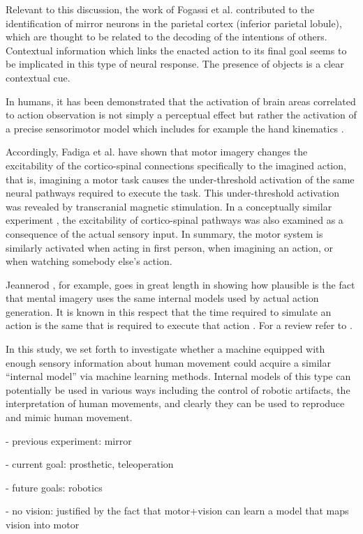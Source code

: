 Relevant to this discussion, the work of Fogassi et al. \cite{fogassi-05} contributed to the 
identification of mirror neurons in the parietal cortex (inferior parietal lobule), which are 
thought to be related to the decoding of the intentions of others. Contextual information 
which links the enacted action to its final goal seems to be implicated in this type of neural 
response. The presence of objects is a clear contextual cue.

In humans, it has been demonstrated that the activation of brain areas correlated to 
action observation is not simply a perceptual effect but rather the activation of
a precise sensorimotor model which includes for example the hand kinematics \cite{pozzo-06}.
 
Accordingly, Fadiga et al. \cite{fadiga-99,vargas-04} have shown that motor imagery changes
the excitability of the cortico-spinal connections specifically to the imagined action, that is, 
imagining a motor task causes the under-threshold activation of the same neural pathways 
required to execute the task. This under-threshold activation was revealed 
by transcranial magnetic stimulation. In a conceptually similar experiment 
\cite{fadiga-05}, the excitability of cortico-spinal pathways was also examined as a consequence 
of the actual sensory input. In summary, the motor system is similarly activated 
when acting in first person, when imagining an action, or when watching somebody else's action.


Jeannerod \cite{jeannerod-88}, for example, goes in great length in showing how plausible is 
the fact that mental imagery uses the same internal models used by actual action generation. 
It is known in this respect that the time required to simulate an action is the same that 
is required to execute that action \cite{sirigu-96}. For a review refer to \cite{jeannerod-99}.

In this study, we set forth to investigate whether a machine equipped with enough sensory 
information about human movement could acquire a similar ``internal model'' via machine 
learning methods. Internal models of this type can potentially be used in various ways
including the control of robotic artifacts, the interpretation of human movements, and 
clearly they can be used to reproduce and mimic human movement. 

- previous experiment: mirror

- current goal: prosthetic, teleoperation

- future goals: robotics

- no vision: justified by the fact that motor+vision can learn a model that maps vision into motor



